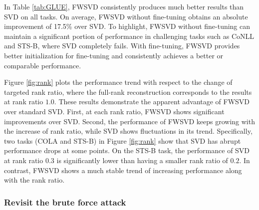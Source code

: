 In Table \ref{tab:GLUE}, FWSVD consistently produces much better results than SVD on all tasks. 
On average, FWSVD without fine-tuning obtains an absolute improvement of 17.5\% over SVD. 
To highlight, FWSVD without fine-tuning can maintain a significant portion of performance in challenging tasks such as CoNLL and STS-B, where SVD completely fails. 
With fine-tuning, FWSVD provides better initialization for fine-tuning and consistently achieves a better or comparable performance.

Figure \ref{fig:rank} plots the performance trend with respect to the change of targeted rank ratio, where the full-rank reconstruction corresponds to the results at rank ratio $1.0$.
These results demonstrate the apparent advantage of FWSVD over standard SVD. 
First, at each rank ratio, FWSVD shows significant improvements over SVD. 
Second, the performance of FWSVD keeps growing with the increase of rank ratio, while SVD shows fluctuations in its trend. 
Specifically, two tasks (COLA and STS-B) in Figure \ref{fig:rank} show that SVD has abrupt performance drops at some points. 
On the STS-B task, the performance of SVD at rank ratio $0.3$ is significantly lower than having a smaller rank ratio of $0.2$.
In contrast, FWSVD shows a much stable trend of increasing performance along with the rank ratio.



\subsubsection{Revisit the brute force attack }\label{sec:mismatch_obj}

